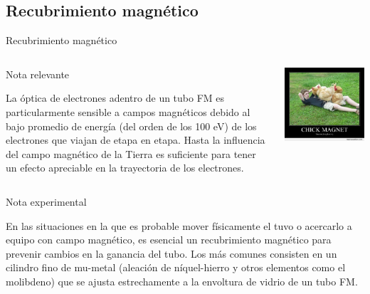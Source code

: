 \documentclass[a4paper,10pt]{beamer}
\begin{document}
\subsection{Recubrimiento magnético}
\begin{frame}{Recubrimiento magnético}
 
 
 \begin{columns}[c]
 
\column{2in}
 \begin{block}{Nota relevante}
  \begin{justify}
  \footnotesize
   La óptica de electrones adentro de un tubo FM es particularmente sensible a campos 
   magnéticos debido al bajo promedio de energía (del orden de los 100 eV) de los 
   electrones que viajan de etapa en etapa. Hasta la influencia del campo magnético 
   de la Tierra es suficiente para tener un efecto apreciable en la trayectoria de 
   los electrones.
  \end{justify}
  \end{block}
    
  \column{2in}
  
  \includegraphics[scale=0.25]{fig31}

   \end{columns}
   
   
  \begin{exampleblock}{Nota experimental}
   \begin{justify}
    En las situaciones en la que es probable mover físicamente el tuvo o 
    acercarlo a equipo con campo magnético, es esencial un recubrimiento magnético 
    para prevenir cambios en la ganancia del tubo. Los más comunes consisten 
    en un cilindro fino de mu-metal (aleación de níquel-hierro y otros elementos 
    como el molibdeno) que se ajusta estrechamente a la envoltura de vidrio de 
    un tubo FM.
   \end{justify}
    \end{exampleblock}

\end{frame}
\end{document}
